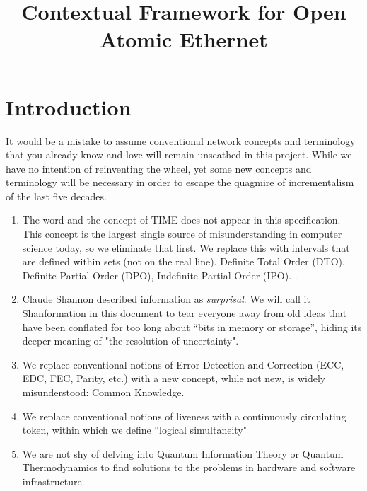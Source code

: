 \documentclass[../HFT-main.tex]{subfiles}
\begin{document}
\title{Contextual Framework for  Open Atomic Ethernet}

\section{Introduction}

It would be a mistake to assume conventional network concepts and terminology that you already know and love will remain unscathed in this project. While we have no intention of reinventing the wheel, yet some new concepts and terminology will be necessary in order to escape the quagmire of incrementalism of the last five decades. %


\begin{enumerate}
\item The word and the concept of TIME does not appear in this specification. This concept is the largest single source of misunderstanding in computer science today, so we  eliminate that first. 
We replace this with intervals that are defined within sets (not on the real line).  Definite Total Order (DTO), Definite Partial Order (DPO), Indefinite Partial Order (IPO). . 
\item 	 Claude Shannon described information as \emph{surprisal}.  We will call it Shanformation in this document to tear everyone away from old ideas that have been conflated for too long about ``bits in memory or storage'', hiding its deeper meaning of "the resolution of uncertainty".
\item 	We replace conventional notions of  Error Detection and Correction (ECC, EDC, FEC, Parity, etc.) with a new concept, while not new, is widely misunderstood: Common Knowledge.
\item 	We replace conventional notions of liveness with  a continuously circulating token, within which we define ``logical simultaneity"
\item		We are not shy of delving into Quantum Information Theory or Quantum Thermodynamics to find solutions to the problems in hardware and software infrastructure.
\end{enumerate}
\end{document}
